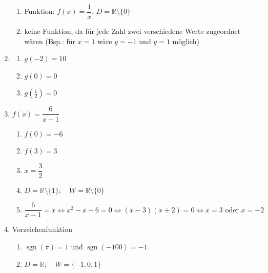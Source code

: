 \begin{enumerate}
\begin{enumerate}
              \item Funktion: $f(x)=\dfrac{1}{x}$,
                    $D=\mathbb{R}\setminus\{0\}$ %

              \item keine Funktion, da für jede Zahl zwei verschiedene Werte zugeordnet wären  (Bsp.: für $x=1$ wäre $y=-1$ und $y=1$ möglich) %
          \end{enumerate}

    \item
          \begin{multicols}{4}
              \begin{enumerate}
                  \item $g(-2)=10$
                  \item $g(0)=0$
                  \item $g\left(\tfrac12\right)=0$
              \end{enumerate}
          \end{multicols}

    \item
          $f(x)=\dfrac{6}{x-1}$

          \begin{enumerate}
              \item $f(0)=-6$

              \item $f(3)=3$

              \item $x=\dfrac{3}{2}$

              \item $D=\mathbb{R}\setminus\{1\};
                        \quad W=\mathbb{R}\setminus\{0\}$

              \item
                    $\dfrac{6}{x-1}=x
                        \Leftrightarrow x^2-x-6=0
                        \Leftrightarrow (x-3)(x+2)=0
                        \Leftrightarrow x=3 \text{ oder } x=-2$
          \end{enumerate}

    \item Vorzeichenfunktion

          \begin{enumerate}
              \item $\operatorname{sgn}(\pi)=1$ und
                    $\operatorname{sgn}(-100)=-1$

              \item $D=\mathbb{R};
                        \quad W=\{-1,0,1\}$


\end{enumerate}
\end{enumerate}
